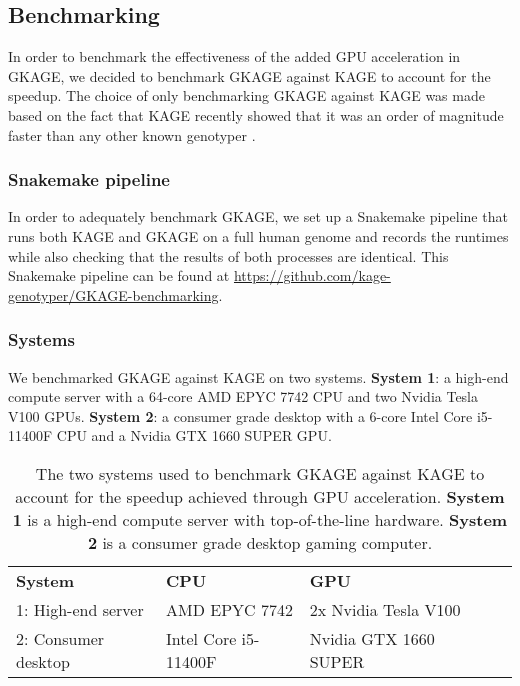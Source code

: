 \subsection{Benchmarking} \label{results:benchmarking}
In order to benchmark the effectiveness of the added GPU acceleration in GKAGE, we decided to benchmark GKAGE against KAGE to account for the speedup.
The choice of only benchmarking GKAGE against KAGE was made based on the fact that KAGE recently showed that it was an order of magnitude faster than any other known genotyper \cite{kage}.

\subsubsection{Snakemake pipeline}
In order to adequately benchmark GKAGE, we set up a Snakemake pipeline that runs both KAGE and GKAGE on a full human genome and records the runtimes while also checking that the results of both processes are identical.
This Snakemake pipeline can be found at \url{https://github.com/kage-genotyper/GKAGE-benchmarking}.

\subsubsection{Systems}
We benchmarked GKAGE against KAGE on two systems.
\textbf{System 1}: a high-end compute server with a 64-core AMD EPYC 7742 CPU and two Nvidia Tesla V100 GPUs.
\textbf{System 2}: a consumer grade desktop with a 6-core Intel Core i5-11400F CPU and a Nvidia GTX 1660 SUPER GPU.

\vspace{1em}
\begin{table}[H]
\begin{center}
\begin{tabular}{lllll}
\cline{1-3}
\multicolumn{1}{|l|}{\textbf{System}} & \multicolumn{1}{l|}{\textbf{CPU}}                  & \multicolumn{1}{l|}{\textbf{GPU}}                   &  \\ \cline{1-3}
\multicolumn{1}{|l|}{1: High-end server} & \multicolumn{1}{l|}{AMD EPYC 7742}        & \multicolumn{1}{l|}{2x Nvidia Tesla V100}     &  \\ \cline{1-3}
\multicolumn{1}{|l|}{2: Consumer desktop} & \multicolumn{1}{l|}{Intel Core i5-11400F} & \multicolumn{1}{l|}{Nvidia GTX 1660 SUPER} &  \\ \cline{1-3}
\end{tabular}
\end{center}
\caption{
  The two systems used to benchmark GKAGE against KAGE to account for the speedup achieved through GPU acceleration.
  \textbf{System 1} is a high-end compute server with top-of-the-line hardware.
  \textbf{System 2} is a consumer grade desktop gaming computer.
}
\label{results:gkage:tables:systems}
\end{table}

